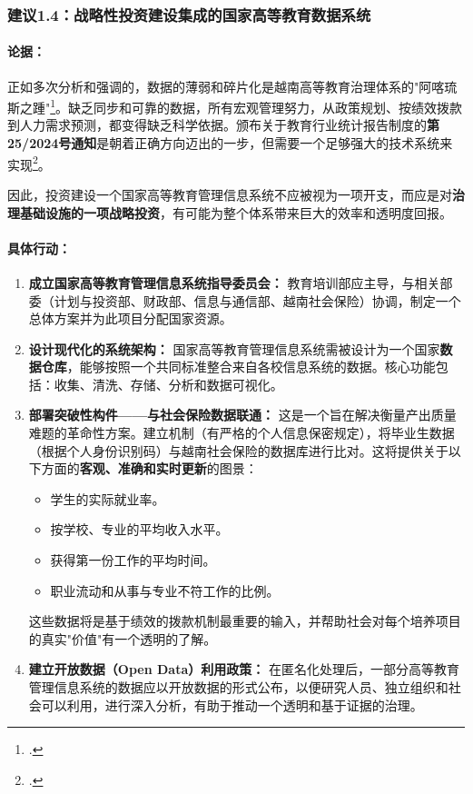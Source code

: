 \subsubsection{建议1.4：战略性投资建设集成的国家高等教育数据系统}

\paragraph{论据：}
正如多次分析和强调的，数据的薄弱和碎片化是越南高等教育治理体系的"阿喀琉斯之踵"\footcite{aunsec_redesigningIQA}。缺乏同步和可靠的数据，所有宏观管理努力，从政策规划、按绩效拨款到人力需求预测，都变得缺乏科学依据。颁布关于教育行业统计报告制度的\textbf{第25/2024号通知}是朝着正确方向迈出的一步，但需要一个足够强大的技术系统来实现\footcite{luatvietnam_tt25_2024}。

因此，投资建设一个国家高等教育管理信息系统不应被视为一项开支，而应是对\textbf{治理基础设施的一项战略投资}，有可能为整个体系带来巨大的效率和透明度回报。

\paragraph{具体行动：}
\begin{enumerate}
    \item \textbf{成立国家高等教育管理信息系统指导委员会：} 教育培训部应主导，与相关部委（计划与投资部、财政部、信息与通信部、越南社会保险）协调，制定一个总体方案并为此项目分配国家资源。
    
    \item \textbf{设计现代化的系统架构：} 国家高等教育管理信息系统需被设计为一个国家\textbf{数据仓库}，能够按照一个共同标准整合来自各校信息系统的数据。核心功能包括：收集、清洗、存储、分析和数据可视化。
    
    \item \textbf{部署突破性构件——与社会保险数据联通：} 这是一个旨在解决衡量产出质量难题的革命性方案。建立机制（有严格的个人信息保密规定），将毕业生数据（根据个人身份识别码）与越南社会保险的数据库进行比对。这将提供关于以下方面的\textbf{客观、准确和实时更新}的图景：
        \begin{itemize}
            \item 学生的实际就业率。
            \item 按学校、专业的平均收入水平。
            \item 获得第一份工作的平均时间。
            \item 职业流动和从事与专业不符工作的比例。
        \end{itemize}
    这些数据将是基于绩效的拨款机制最重要的输入，并帮助社会对每个培养项目的真实"价值"有一个透明的了解。
    
    \item \textbf{建立开放数据（Open Data）利用政策：} 在匿名化处理后，一部分高等教育管理信息系统的数据应以开放数据的形式公布，以便研究人员、独立组织和社会可以利用，进行深入分析，有助于推动一个透明和基于证据的治理。
\end{enumerate}

